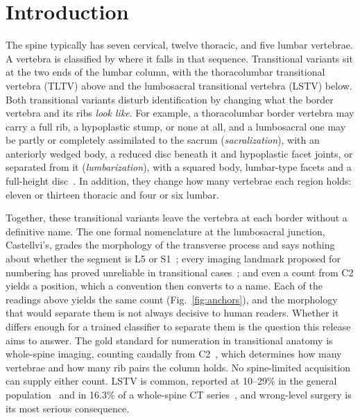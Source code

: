 \documentclass[aapm,mph,amsmath,amssymb,reprint]{revtex4-2}
\begin{document}
\maketitle

\section{Introduction}

The spine typically has seven cervical, twelve thoracic, and five lumbar vertebrae. A
vertebra is classified by where it falls in that sequence. Transitional variants sit at the
two ends of the lumbar column, with the thoracolumbar transitional vertebra (TLTV) above and the
lumbosacral transitional vertebra (LSTV) below. Both transitional variants disturb identification by changing what the border vertebra
and its ribs \emph{look like}. For example, a thoracolumbar border vertebra may carry a full rib, a hypoplastic stump, or none at all, and
a lumbosacral one may be partly or completely assimilated to the sacrum
(\emph{sacralization}), with an anteriorly wedged body, a reduced disc beneath it and
hypoplastic facet joints, or separated from it (\emph{lumbarization}), with a
squared body, lumbar-type facets and a full-height disc~\cite{koninwalz2010}. In addition, they
change how many vertebrae each region holds: eleven or thirteen thoracic and four or six lumbar.

Together, these transitional variants leave the vertebra at each border without a definitive name. The one formal nomenclature at the lumbosacral junction, Castellvi's, grades the morphology of the transverse process and says nothing about whether the segment is L5 or S1~\cite{castellvi1984,koninwalz2010}; every imaging landmark proposed for numbering has proved unreliable in transitional cases~\cite{carrino2011,farshad2015,tureli2014}; and even a count from C2 yields a position, which a convention then converts to a name. Each of the readings above yields the same count (Fig.~\ref{fig:anchors}), and the morphology that would
separate them is not always decisive to human readers. Whether it differs
enough for a trained classifier to separate them is the question this release aims to answer. The gold standard for numeration in
transitional anatomy is whole-spine imaging, counting caudally from C2~\cite{lian2018},
which determines how many vertebrae and how many rib pairs the column holds. No
spine-limited acquisition can supply either count. LSTV is common, reported at 10--29\% in the general
population~\cite{hanhivaara2022} and in 16.3\% of a whole-spine CT
series~\cite{nagata2025}, and wrong-level surgery is its most serious consequence.
\end{document}

